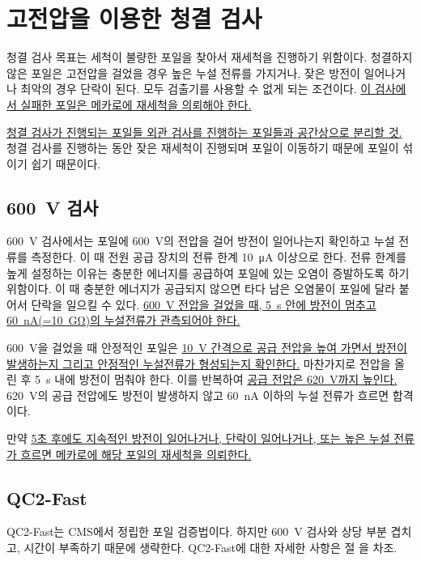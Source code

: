 \section{고전압을 이용한 청결 검사}
청결 검사 목표는 세척이 불량한 포일을 찾아서 재세척을 진행하기 위함이다. 청결하지 않은 포일은 고전압을 걸었을 경우 높은 누설 전류를 가지거나, 잦은 방전이 일어나거나 최악의 경우 단락이 된다. 모두 검출기를 사용할 수 없게 되는 조건이다. \uline{이 검사에서 실패한 포일은 메카로에 재세척을 의뢰해야 한다.}

\uline{청결 검사가 진행되는 포일들 외관 검사를 진행하는 포일들과 공간상으로 분리할 것.} 청결 검사를 진행하는 동안 잦은 재세척이 진행되며 포일이 이동하기 때문에 포일이 섞이기 쉽기 때문이다.

\subsection{\SI{600}{\volt} 검사}
\SI{600}{\volt} 검사에서는 포일에 \SI{600}{\volt}의 전압을 걸어 방전이 일어나는지 확인하고 누설 전류를 측정한다. 이 때 전원 공급 장치의 전류 한계 \SI{10}{\micro\ampere} 이상으로 한다. 전류 한계를 높게 설정하는 이유는 충분한 에너지를 공급하여 포일에 있는 오염이 증발하도록 하기 위함이다. 이 때 충분한 에너지가 공급되지 않으면 타다 남은 오염물이 포일에 달라 붙어서 단락을 일으킬 수 있다. \uline{\mbox{\SI{600}{\volt}} 전압을 걸었을 때, \mbox{\SI{5}{\second}} 안에 방전이 멈추고 \mbox{\SI{60}{\nano\ampere}}(=\mbox{\SI{10}{\giga\ohm}})의 누설전류가 관측되어야 한다.}

\SI{600}{\volt}을 걸었을 때 안정적인 포일은 \uline{\mbox{\SI{10}{\volt}} 간격으로 공급 전압을 높여 가면서 방전이 발생하는지 그리고 안정적인 누설전류가 형성되는지 확인한다.} 마찬가지로 전압을 올린 후 \SI{5}{\second} 내에 방전이 멈춰야 한다. 이를 반복하여 \uline{공급 전압은 \mbox{\SI{620}{\volt}}까지 높인다.} \SI{620}{\volt}의 공급 전압에도 방전이 발생하지 않고 \SI{60}{\nano\ampere} 이하의 누설 전류가 흐르면 합격이다.

만약 \uline{5초 후에도 지속적인 방전이 일어나거나, 단락이 일어나거나, 또는 높은 누설 전류가 흐르면 메카로에 해당 포일의 재세척을 의뢰한다.}

\subsection{QC2-Fast}
QC2-Fast는 CMS에서 정립한 포일 검증법이다. 하지만 \SI{600}{\volt} 검사와 상당 부분 겹치고, 시간이 부족하기 때문에 생략한다. QC2-Fast에 대한 자세한 사항은 절 \label{sec:qc2_fast}을 차조.

